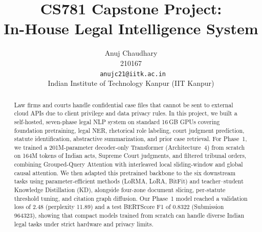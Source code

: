 \documentclass[11pt, oneside]{article}
\title{CS781 Capstone Project:\\
In-House Legal Intelligence System}
\author{
    Anuj Chaudhary  \\
    210167 \\
    {\tt \ anujc21@iitk.ac.in}\\
    Indian Institute of Technology Kanpur (IIT Kanpur)
}
\date{}
\begin{document}
\maketitle
\begin{abstract}
Law firms and courts handle confidential case files that cannot be sent to external cloud APIs due to client privilege and data privacy rules. In this project, we built a self-hosted, seven-phase legal NLP system on standard 16\,GB GPUs covering foundation pretraining, legal NER, rhetorical role labeling, court judgment prediction, statute identification, abstractive summarization, and prior case retrieval. For Phase~1, we trained a 201M-parameter decoder-only Transformer (Architecture~4) from scratch on 164M tokens of Indian acts, Supreme Court judgments, and filtered tribunal orders, combining Grouped-Query Attention with interleaved local sliding-window and global causal attention. We then adapted this pretrained backbone to the six downstream tasks using parameter-efficient methods (LoRMA, LoRA, BitFit) and teacher--student Knowledge Distillation (KD), alongside four-zone document slicing, per-statute threshold tuning, and citation graph diffusion. Our Phase~1 model reached a validation loss of 2.48 (perplexity 11.89) and a test BERTScore F1 of 0.8322 (Submission 964323), showing that compact models trained from scratch can handle diverse Indian legal tasks under strict hardware and privacy limits.
\end{abstract}

\end{document}
